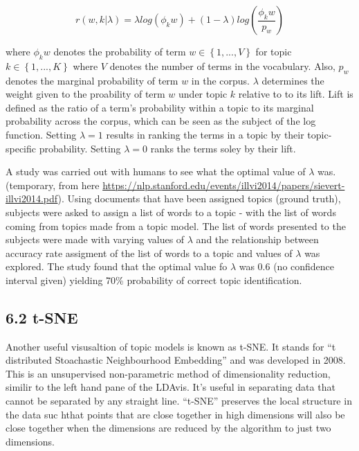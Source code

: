 \documentclass[
]{article}
\begin{document}
\begin{equation}
r(w,k|\lambda)=\lambda log(\phi_kw) + (1-\lambda)log(\frac{\phi_kw}{p_w})
\end{equation}

where \(\phi_kw\) denotes the probability of term
\(w\in \left \{ 1,...,V \right \}\) for topic
\(k\in \left \{ 1,...,K \right \}\) where \(V\) denotes the number of
terms in the vocabulary. Also, \(p_w\) denotes the marginal probability
of term \(w\) in the corpus. \(\lambda\) determines the weight given to
the proability of term \(w\) under topic \(k\) relative to to its lift.
Lift is defined as the ratio of a term's probability within a topic to
its marginal probability across the corpus, which can be seen as the
subject of the log function. Setting \(\lambda =1\) results in ranking
the terms in a topic by their topic-specific probability. Setting
\(\lambda=0\) ranks the terms soley by their lift.

A study was carried out with humans to see what the optimal value of
\(\lambda\) was. (temporary, from here
\url{https://nlp.stanford.edu/events/illvi2014/papers/sievert-illvi2014.pdf}).
Using documents that have been assigned topics (ground truth), subjects
were asked to assign a list of words to a topic - with the list of words
coming from topics made from a topic model. The list of words presented
to the subjects were made with varying values of \(\lambda\) and the
relationship between accuracy rate assigment of the list of words to a
topic and values of \(\lambda\) was explored. The study found that the
optimal value fo \(\lambda\) was 0.6 (no confidence interval given)
yielding 70\% probability of correct topic identification.

\hypertarget{t-sne}{%
\subsection{6.2 t-SNE}\label{t-sne}}

Another useful visusaltion of topic models is known as t-SNE. It stands
for ``t distributed Stoachastic Neighbourhood Embedding'' and was
developed in 2008. This is an unsupervised non-parametric method of
dimensionality reduction, similir to the left hand pane of the LDAvis.
It's useful in separating data that cannot be separated by any straight
line. ``t-SNE'' preserves the local structure in the data suc hthat
points that are close together in high dimensions will also be close
together when the dimensions are reduced by the algorithm to just two
dimensions.
\end{document}
